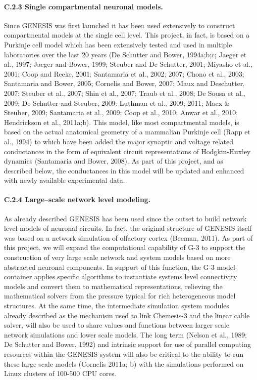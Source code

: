 \documentclass[12pt]{article}
\begin{document}
\paragraph{C.2.3 Single compartmental neuronal models.} Since GENESIS was first launched it has been used extensively to construct compartmental models at the single cell level. This project, in fact, is based on a Purkinje cell model which has been extensively tested and used in multiple laboratories over the last 20 years (De Schutter and Bower, 1994a;b;c; Jaeger et al., 1997; Jaeger and Bower, 1999; Steuber and De Schutter, 2001; Miyasho et al., 2001; Coop and Reeke, 2001; Santamaria et al., 2002; 2007; Chono et al., 2003; Santamaria and Bower, 2005; Cornelis and Bower, 2007; Maux and Deschutter, 2007; Steuber et al., 2007; Shin et al., 2007; Traub et al., 2008; De Sousa et al., 2009; De Schutter and Steuber, 2009: Luthman et al., 2009; 2011; Maex \& Steuber, 2009; Santamaria et al., 2009; Coop et al., 2010; Anwar et al., 2010; Hendrickson et al., 2011a;b). This model, like most compartmental models, is based on the actual anatomical geometry of a mammalian Purkinje cell (Rapp et al., 1994) to which have been added the major synaptic and voltage related conductances in the form of equivalent circuit representations of Hodgkin-Huxley dynamics (Santamaria and Bower, 2008). As part of this project, and as described below, the conductances in this model will be updated and enhanced with newly available experimental data.

\paragraph{C.2.4 Large--scale network level modeling.} As already described GENESIS has been used since the outset to build network level models of neuronal circuits. In fact, the original structure of GENESIS itself was based on a network simulation of olfactory cortex (Beeman, 2011). As part of this project, we will expand the computational capability of G-3 to support the construction of very large scale network and system models based on more abstracted neuronal components. In support of this function, the G-3 model-container applies specific algorithms to instantiate systems level connectivity models and convert them to mathematical representations, relieving the mathematical solvers from the pressure typical for rich heterogeneous model structures. At the same time, the intermediate simulation system modules already described as the mechanism used to link Chemesis-3 and the linear cable solver, will also be used to share values and functions between larger scale network simulations and lower scale models. The long term (Nelson et al., 1989; De Schutter and Bower, 1992) and intrinsic support for use of parallel computing resources within the GENESIS system will also be critical to the ability to run these large scale models (Cornelis 2011a; b) with the simulations performed on Linux clusters of 100-500 CPU cores. \\
\end{document}
